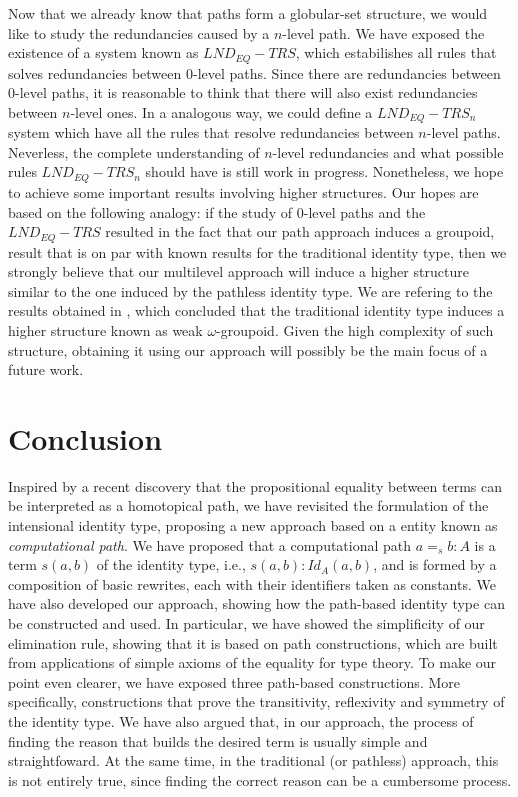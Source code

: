 \documentclass{entcs} \usepackage{entcsmacro}
\begin{document}
Now that we already know that paths form a globular-set structure, we would like to study the redundancies caused by a $n$-level path. We have exposed the existence of a system known as $LND_{EQ}-TRS$, which estabilishes all rules that solves redundancies between $0$-level paths. Since there are redundancies between $0$-level paths, it is reasonable to think that there will also exist redundancies between $n$-level ones. In a analogous way, we could define a $LND_{EQ}-TRS_{n}$ system which have all the rules that resolve redundancies between $n$-level paths. Neverless, the complete understanding of $n$-level redundancies and what possible rules $LND_{EQ}-TRS_{n}$ should have is still work in progress. Nonetheless, we hope to achieve some important results involving higher structures. Our hopes are based on the following analogy: if the study of $0$-level paths and the  $LND_{EQ}-TRS$ resulted in the fact that our path approach induces a groupoid, result that is on par with known results for the traditional identity type, then we strongly believe that our multilevel approach will induce a higher structure similar to the one induced by the pathless identity type. We are refering to the results obtained in \cite{lumsdaine1,Benno}, which concluded that the traditional identity type induces a higher structure known as weak $\omega$-groupoid. Given the high complexity of such structure, obtaining it using our approach will possibly be the main focus of a future work.

\section{Conclusion}

Inspired by a recent discovery that the propositional equality between terms can be interpreted as a homotopical path, we have revisited the formulation of the intensional identity type, proposing a new approach based on a entity known as {\em computational path}. We have proposed that a computational path $a =_{s} b : A$ is a term $s(a,b)$ of the identity type, i.e., $s(a,b) : Id_{A}(a,b)$, and is formed by a composition of basic rewrites, each with their identifiers taken as constants. We have also developed our approach, showing how the path-based identity type can be constructed and used. In particular, we have showed the simplificity of our elimination rule, showing that it is based on path constructions, which are built from applications of simple axioms of the equality for type theory. To make our point even clearer, we have exposed three path-based constructions. More specifically, constructions that prove the transitivity, reflexivity and symmetry of the identity type. We have also argued that, in our approach, the process of finding the reason that builds the desired term is usually simple and straightfoward. At the same time, in the traditional (or pathless) approach, this is not entirely true, since finding the correct reason can be a cumbersome process.
\end{document}
